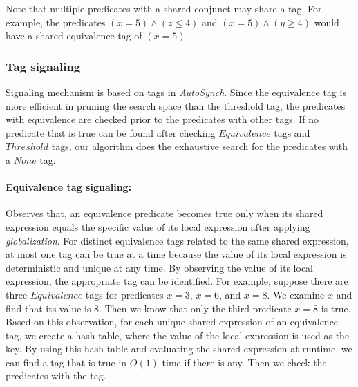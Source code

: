 \documentclass[preprint]{sigplanconf}
\begin{document}
Note that multiple predicates with a shared conjunct may share a tag. For example,
the predicates $(x=5) \wedge (z \leq 4)$ and $(x=5) \wedge (y \geq 4)$ would have a shared equivalence tag
of $(x=5)$.

\subsubsection{Tag signaling}
Signaling mechanism is based on tags in {\em AutoSynch}. 
Since the equivalence tag is more efficient in pruning the search space than the threshold tag, the
predicates with equivalence are checked prior to the predicates with other 
tags. If no predicate that is true can be found after checking $Equivalence$ 
tags and $Threshold$ tags, our algorithm does the exhaustive search for the 
predicates with a $None$ tag. 

\paragraph{Equivalence tag signaling:}
Observes that, an equivalence predicate becomes true only when its shared 
expression equals the specific value of its local expression after applying
{\em globalization}. For distinct equivalence tags related to the same shared 
expression, at most one tag can be true at a time because the value of its
local expression is deterministic and unique at any time. By 
observing the value of its local expression, the appropriate tag can be 
identified. For example, suppose there are three $Equivalence$ tags for
predicates $x = 3$, $x = 6$, and $x = 8$. We examine $x$ and find that
its value is $8$. Then we know that only the third predicate $x = 8$ is true. Based on this 
observation, for each unique shared expression of an equivalence tag, we 
create a hash table, where the value of the local expression is used as the 
key. By using this 
hash table and evaluating the shared expression at runtime, we can find a
tag that is true in $O(1)$ time if there is any. Then we check the predicates 
with the tag. 

\end{document}
